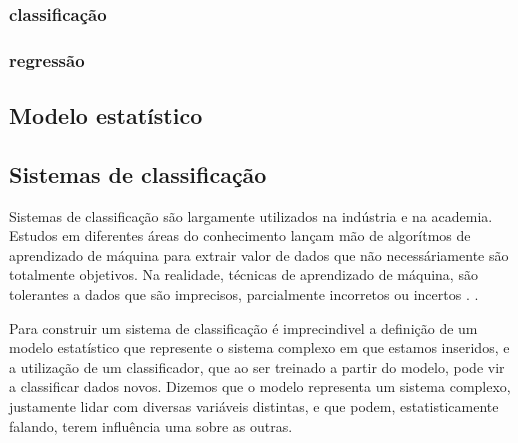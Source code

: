 \subsubsection{classificação}

\subsubsection{regressão}

\subsection{Modelo estatístico}

\subsection{Sistemas de classificação}
Sistemas de classificação são largamente utilizados na indústria e na academia. Estudos em diferentes áreas do conhecimento
lançam mão de algorítmos de aprendizado de máquina para extrair valor de dados que não necessáriamente são totalmente objetivos. Na realidade,
técnicas de aprendizado de máquina, são tolerantes a dados que são imprecisos, parcialmente incorretos ou incertos \cite{Malhotra}. .



Para construir um sistema de classificação é imprecindivel a definição de um modelo estatístico que represente o sistema complexo em que estamos inseridos, e a utilização de um classificador, que ao ser treinado a partir do modelo, pode vir a classificar dados novos. Dizemos que o modelo representa um sistema complexo, justamente lidar com diversas variáveis distintas, e que podem, estatisticamente falando, terem influência uma sobre as outras.
